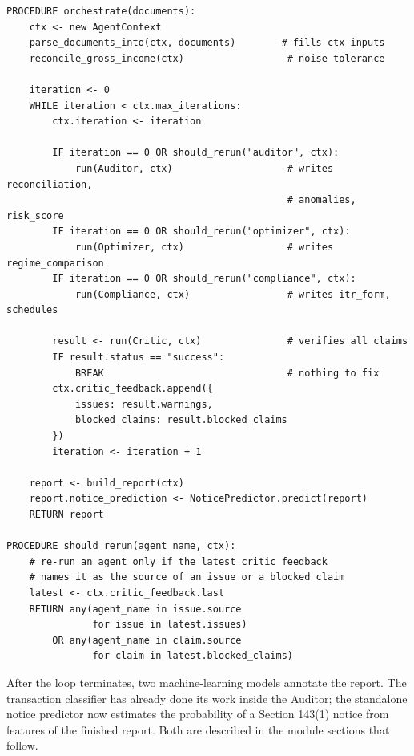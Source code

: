 \begin{lstlisting}[style=pseudo]
PROCEDURE orchestrate(documents):
    ctx <- new AgentContext
    parse_documents_into(ctx, documents)        # fills ctx inputs
    reconcile_gross_income(ctx)                  # noise tolerance

    iteration <- 0
    WHILE iteration < ctx.max_iterations:
        ctx.iteration <- iteration

        IF iteration == 0 OR should_rerun("auditor", ctx):
            run(Auditor, ctx)                    # writes reconciliation,
                                                 # anomalies, risk_score
        IF iteration == 0 OR should_rerun("optimizer", ctx):
            run(Optimizer, ctx)                  # writes regime_comparison
        IF iteration == 0 OR should_rerun("compliance", ctx):
            run(Compliance, ctx)                 # writes itr_form, schedules

        result <- run(Critic, ctx)               # verifies all claims
        IF result.status == "success":
            BREAK                                # nothing to fix
        ctx.critic_feedback.append({
            issues: result.warnings,
            blocked_claims: result.blocked_claims
        })
        iteration <- iteration + 1

    report <- build_report(ctx)
    report.notice_prediction <- NoticePredictor.predict(report)
    RETURN report

PROCEDURE should_rerun(agent_name, ctx):
    # re-run an agent only if the latest critic feedback
    # names it as the source of an issue or a blocked claim
    latest <- ctx.critic_feedback.last
    RETURN any(agent_name in issue.source
               for issue in latest.issues)
        OR any(agent_name in claim.source
               for claim in latest.blocked_claims)
\end{lstlisting}

After the loop terminates, two machine-learning models annotate the report. The
transaction classifier has already done its work inside the Auditor; the
standalone notice predictor now estimates the probability of a Section 143(1)
notice from features of the finished report. Both are described in the module
sections that follow.

